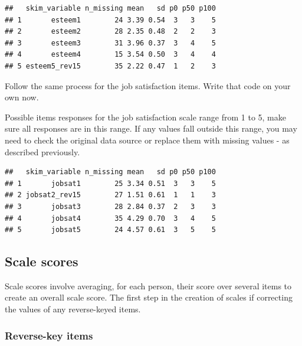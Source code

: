 \documentclass[
]{krantz}
\makeatletter
\newenvironment{Shaded}{\begin{snugshade}}{\end{snugshade}}
\newcommand{\KeywordTok}[1]{\textcolor[rgb]{0.27,0.27,0.27}{\textbf{#1}}}
\newcommand{\NormalTok}[1]{#1}
\newcommand{\OperatorTok}[1]{\textcolor[rgb]{0.43,0.43,0.43}{\textbf{#1}}}
\newcommand{\StringTok}[1]{\textcolor[rgb]{0.5,0.5,0.5}{#1}}
\newenvironment{kframe}{%
\medskip{}
\setlength{\fboxsep}{.8em}
 \def\at@end@of@kframe{}%
 \ifinner\ifhmode%
  \def\at@end@of@kframe{\end{minipage}}%
  \begin{minipage}{\columnwidth}%
 \fi\fi%
 \def\FrameCommand##1{\hskip\@totalleftmargin \hskip-\fboxsep
 \colorbox{shadecolor}{##1}\hskip-\fboxsep
     \hskip-\linewidth \hskip-\@totalleftmargin \hskip\columnwidth}%
 \MakeFramed {\advance\hsize-\width
   \@totalleftmargin\z@ \linewidth\hsize
   \@setminipage}}%
 {\par\unskip\endMakeFramed%
 \at@end@of@kframe}
\renewenvironment{Shaded}{\begin{kframe}}{\end{kframe}}
\makeatother
\begin{document}
\begin{verbatim}
##   skim_variable n_missing mean   sd p0 p50 p100
## 1       esteem1        24 3.39 0.54  3   3    5
## 2       esteem2        28 2.35 0.48  2   2    3
## 3       esteem3        31 3.96 0.37  3   4    5
## 4       esteem4        15 3.54 0.50  3   4    4
## 5 esteem5_rev15        35 2.22 0.47  1   2    3
\end{verbatim}

Follow the same process for the job satisfaction items. Write that code on your own now.

Possible items responses for the job satisfaction scale range from 1 to 5, make sure all responses are in this range. If any values fall outside this range, you may need to check the original data source or replace them with missing values - as described previously.

\begin{Shaded}
\end{Shaded}

\begin{verbatim}
##   skim_variable n_missing mean   sd p0 p50 p100
## 1       jobsat1        25 3.34 0.51  3   3    5
## 2 jobsat2_rev15        27 1.51 0.61  1   1    3
## 3       jobsat3        28 2.84 0.37  2   3    3
## 4       jobsat4        35 4.29 0.70  3   4    5
## 5       jobsat5        24 4.57 0.61  3   5    5
\end{verbatim}

\hypertarget{scale-scores}{%
\subsection{Scale scores}\label{scale-scores}}

Scale scores involve averaging, for each person, their score over several items to create an overall scale score. The first step in the creation of scales if correcting the values of any reverse-keyed items.

\hypertarget{reverse-key-items}{%
\subsubsection{Reverse-key items}\label{reverse-key-items}}
\end{document}
